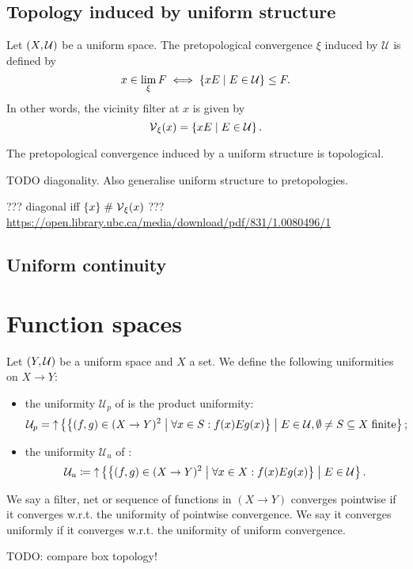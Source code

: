 \subsection{Topology induced by uniform structure}
\begin{definition}
Let $\left( X,\mathcal{U} \right)$ be a uniform space. The pretopological convergence $\xi$ induced by $\mathcal{U}$ is defined by
\[ x\in \lim_\xi F \iff \left\{ xE \;\middle|\; E\in \mathcal{U} \right\} \leq F. \]
In other words, the vicinity filter at $x$ is given by
\[ \operatorname{\mathcal{V}}_\xi(x) = \left\{ xE \;\middle|\; E\in \mathcal{U} \right\}. \]
\end{definition}

\begin{proposition}
The pretopological convergence induced by a uniform structure is topological.
\end{proposition}
TODO diagonality. Also generalise uniform structure to pretopologies.

??? diagonal iff $\{x\} \mathrel{\#} \operatorname{\mathcal{V}}_\xi(x)$ ???
\url{https://open.library.ubc.ca/media/download/pdf/831/1.0080496/1}

\subsection{Uniform continuity}

\section{Function spaces}
\begin{definition}
Let $\left( Y,\mathcal{U} \right)$ be a uniform space and $X$ a set. We define the following uniformities on $X\to Y$:
\begin{itemize}
\item the uniformity $\mathcal{U}_p$ of  is the product uniformity:
\[ \mathcal{U}_p = \operatorname{\uparrow}\left\{ \left\{ (f,g)\in (X\to Y)^2 \;\middle|\; \forall x\in S: f(x)Eg(x) \right\} \;\middle|\; E\in \mathcal{U}, \emptyset \neq S\subseteq X \;\text{finite} \right\}; \]
\item the uniformity $\mathcal{U}_u$ of :
\[ \mathcal{U}_u \coloneqq \operatorname{\uparrow}\left\{ \left\{ (f,g)\in (X\to Y)^2 \;\middle|\; \forall x\in X: f(x)Eg(x) \right\} \;\middle|\; E\in \mathcal{U} \right\}. \]
\end{itemize}
We say a filter, net or sequence of functions in $(X\to Y)$ converges pointwise if it converges w.r.t. the uniformity of pointwise convergence. We say it converges uniformly if it converges w.r.t. the uniformity of uniform convergence.
\end{definition}
TODO: compare box topology!


